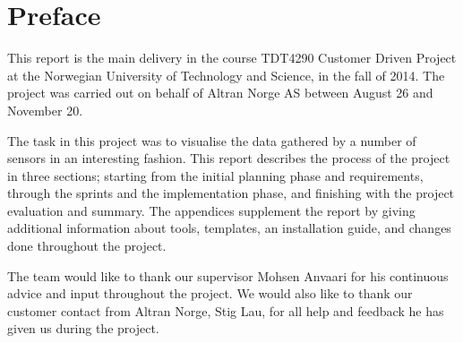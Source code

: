 \documentclass[../document.tex]{subfiles}
\begin{document}
\section*{Preface}
This report is the main delivery in the course TDT4290 Customer Driven Project at the Norwegian University of Technology and Science, in the fall of 2014. The project was carried out on behalf of Altran Norge AS between August 26 and November 20. 

The task in this project was to visualise the data gathered by a number of sensors in an interesting fashion. This report describes the process of the project in three sections; starting from the initial planning phase and requirements, through the sprints and the implementation phase, and finishing with the project evaluation and summary. The appendices supplement the report by giving additional information about tools, templates, an installation guide, and changes done throughout the project.

The team would like to thank our supervisor Mohsen Anvaari for his continuous advice and input throughout the project. We would also like to thank our customer contact from Altran Norge, Stig Lau, for all help and feedback he has given us during the project. 
\end{document}
